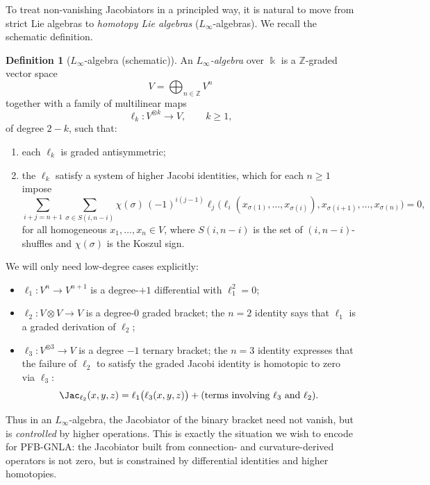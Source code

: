 \documentclass[11pt]{book}
\theoremstyle{plain}
\theoremstyle{definition}
\newtheorem{definition}[theorem]{Definition} \theoremstyle{remark}
\begin{document}
To treat non-vanishing Jacobiators in a principled way, it is natural
to move from strict Lie algebras to \emph{homotopy Lie algebras}
($L_\infty$-algebras). We recall the schematic definition.

\begin{definition}[$L_\infty$-algebra (schematic)]
An \emph{$L_\infty$-algebra} over $\Bbbk$ is a $\mathbb{Z}$-graded
  vector space
  \[
     V = \bigoplus_{n\in\mathbb{Z}} V^n
  \]
  together with a family of multilinear maps
  \[
     \ell_k:
       V^{\otimes k}\longrightarrow V,
     \qquad k\ge1,
  \]
  of degree $2-k$, such that:
  \begin{enumerate}[label=\roman*)]
    \item each $\ell_k$ is graded antisymmetric;
    \item the $\ell_k$ satisfy a system of higher Jacobi identities,
          which for each $n\ge1$ impose
          \[
            \sum_{i+j=n+1}
            \sum_{\sigma\in S(i,n-i)}
            \chi(\sigma)\,
            (-1)^{i(j-1)}
            \ell_j\bigl(
               \ell_i(x_{\sigma(1)},\dots,x_{\sigma(i)}),
               x_{\sigma(i+1)},\dots,x_{\sigma(n)}
            \bigr)
            = 0,
          \]
          for all homogeneous $x_1,\dots,x_n\in V$, where
          $S(i,n-i)$ is the set of $(i,n-i)$-shuffles and $\chi(\sigma)$
          is the Koszul sign.
  \end{enumerate}
\end{definition}

We will only need low-degree cases explicitly:

\begin{itemize}
  \item $\ell_1:V^n\to V^{n+1}$ is a degree-$+1$ differential with
        $\ell_1^2=0$;
  \item $\ell_2:V\otimes V\to V$ is a degree-$0$ graded bracket; the
        $n=2$ identity says that $\ell_1$ is a graded derivation of
        $\ell_2$;
  \item $\ell_3:V^{\otimes3}\to V$ is a degree $-1$ ternary bracket;
        the $n=3$ identity expresses that the failure of $\ell_2$ to
        satisfy the graded Jacobi identity is homotopic to zero via
        $\ell_3$:
        \[
           \Jac_{\ell_2}(x,y,z)
           =
           \ell_1\bigl(\ell_3(x,y,z)\bigr)
           + \text{(terms involving }\ell_3\text{ and }\ell_2).
        \]
\end{itemize}

Thus in an $L_\infty$-algebra, the Jacobiator of the binary bracket
need not vanish, but is \emph{controlled} by higher operations. This is
exactly the situation we wish to encode for PFB-GNLA: the Jacobiator
built from connection- and curvature-derived operators is not zero,
but is constrained by differential identities and higher homotopies.
\end{document}
